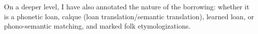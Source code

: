 On a deeper level, I have also annotated the nature of the borrowing: whether it is a phonetic loan, calque (loan translation/semantic translation), learned loan, or phono-semantic matching, and marked folk etymologizations.



